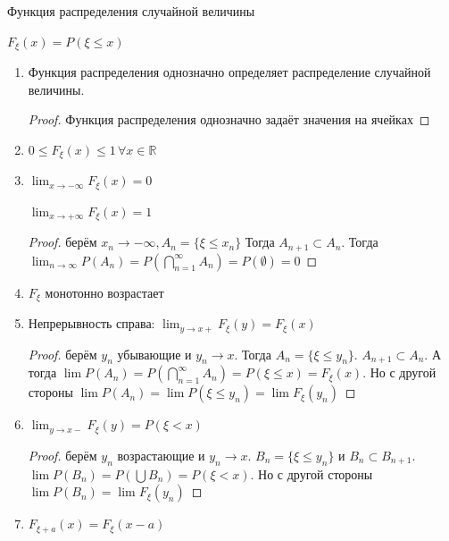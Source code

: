 \begin{definition}
    Функция распределения случайной величины

    $F_{\xi} (x) = P(\xi \leqslant x)$
\end{definition}

\begin{properties}
    \begin{enumerate}
        \item {
        Функция распределения однозначно определяет распределение
        случайной величины.

        \begin{proof}
            Функция распределения однозначно задаёт значения на ячейках
        \end{proof}
        }
        \item {
            $0 \leqslant F_{\xi}(x) \leqslant 1 \, \forall x \in \mathbb{R}$
        }

        \item {
            $\lim_{x \to -\infty} F_{\xi} (x) = 0$

            $\lim_{x \to +\infty} F_{\xi} (x) = 1$

            \begin{proof}
                берём $x_n \to -\infty, A_n = \{ \xi \leqslant x_n \} $
                Тогда $A_{n + 1} \subset A_n$. Тогда $\lim_{n \to \infty} P(A_n) =
                P(\bigcap_{n = 1}^{\infty} A_n) = P(\emptyset) = 0$
            \end{proof}
        }
        \item {
            $F_{\xi}$ монотонно возрастает
        }
        \item {
            Непрерывность справа: $\lim_{y \to x+} F_{\xi} (y) = F_{\xi} (x)$

            \begin{proof}
                берём $y_n$ убывающие и $y_n \to x$.
                Тогда $A_n = \{ \xi \leqslant y_n \}$. $A_{n + 1} \subset A_n$.
                А тогда $\lim P(A_n) = P(\bigcap_{n = 1}^{\infty} A_n) = P(\xi \leqslant x) = F_{\xi} (x)$.
                Но с другой стороны $\lim P(A_n) = \lim P(\xi \leqslant y_n) = \lim F_{\xi} (y_n)$
            \end{proof}

            }
        \item {
            $\lim_{y \to x-} F_{\xi} (y) = P(\xi < x)$

            \begin{proof}
                берём $y_n$ возрастающие и
                $y_n \to x$. $B_n = \{ \xi \leqslant y_n \}$ и $B_{n} \subset B_{n + 1}$.
                $\lim P(B_n) = P(\bigcup B_n) = P(\xi < x)$. Но с другой стороны
                $\lim P(B_n) = \lim F_{\xi} (y_n)$
            \end{proof}
        }
        \item {
            $F_{\xi + a} (x) = F_{\xi} (x - a)$

}
\end{enumerate}
\end{properties}
